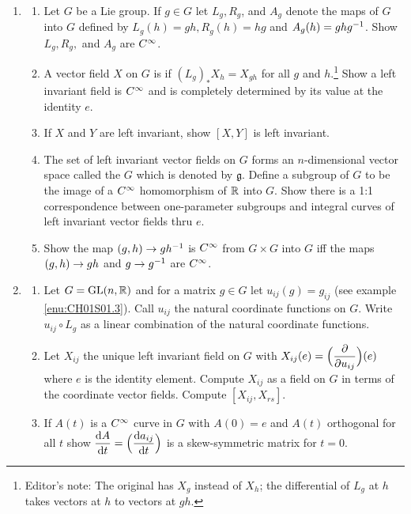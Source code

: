 \documentclass[../main]{subfiles}
\begin{document}
\begin{enumerate}
\item\label{pro:20}
\begin{enumerate}[label=(\roman{enumii})]
    \item Let $G$ be a Lie group. If $g \in G$ let $L_g, R_g$, and $A_g$ denote the maps of $G$ into $G$ defined by $L_g (h) = gh, R_g (h) = hg$ and $A_g (h) = ghg^{-1}$. Show $L_g, R_g,$ and $A_g$ are $C^\infty$. 
    \item A vector field $X$ on $G$ is  if $(L_g)_* X_h = X_{gh}$ for all $g$ and $h$.\footnote{Editor's note: The original has $X_g$ instead of $X_h$; the differential of $L_g$ at $h$ takes vectors at $h$ to vectors at $gh$.} Show a left invariant field is $C^\infty$ and is completely determined by its value at the identity $e$.
    \item If $X$ and $Y$ are left invariant, show $[X,Y]$ is left invariant.
    \item The set of left invariant vector fields on $G$ forms an $n$-dimensional vector space called the  $G$ which is denoted by $\mathfrak{g}$. Define a  subgroup of $G$ to be the image of a $C^\infty$ homomorphism of $\mathbb{R}$ into $G$. Show there is a 1:1 correspondence between one-parameter subgroups and integral curves of left invariant vector fields thru $e$.
    \item Show the map $(g,h) \to gh^{-1}$ is $C^\infty$ from $G\times G$ into $G$ iff the maps $(g,h) \to gh$ and $g \to g^{-1}$ are $C^\infty$.
\end{enumerate}


\item\label{pro:21}
\begin{enumerate}[label=(\roman{enumii})]
    \item Let $G=\mathrm{GL}(n,\mathbb{R})$ and for a matrix $g \in G$ let $u_{i j} (g) = g_{i  j}$ (see example \ref{enu:CH01S01.3}). Call $u_{i  j}$ the natural coordinate functions on $G$. Write $u_{i  j} \circ L_g$ as a linear combination of the natural coordinate functions.
    \item Let $X_{i  j}$ the unique left invariant field on $G$ with $X_{i  j} (e) = \Big(\dfrac{\partial }{\partial u_{i  j}}\Big)(e)$ where $e$ is the identity element. Compute $X_{i  j}$ as a field on $G$ in terms of the coordinate vector fields. Compute $[X_{i  j}, X_{r  s}]$.
    \item If $A(t)$ is a $C^\infty$ curve in $G$ with $A(0)=e$ and $A(t)$ orthogonal for all $t$ show $\dfrac{\mathrm{d}A}{\mathrm{d}t} = \Big(\dfrac{\mathrm{d}a_{ij}}{\mathrm{d}t}\Big)$ is a skew-symmetric matrix for $t=0$. 
\end{enumerate}


\end{enumerate}
\end{document}
